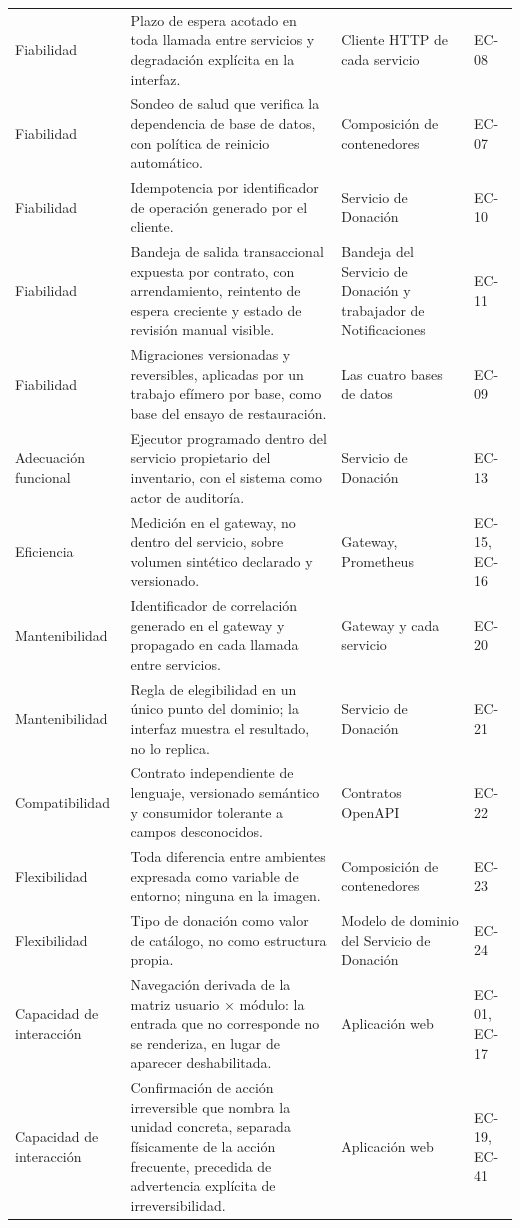 \documentclass[11pt,a4paper]{article}
\begin{document}
\begin{longtable}{L{2.4cm} L{5.6cm} L{3.4cm} L{2.4cm}}
Fiabilidad & Plazo de espera acotado en toda llamada entre servicios y degradación explícita en la interfaz. & Cliente HTTP de cada servicio & EC-08 \\
Fiabilidad & Sondeo de salud que verifica la dependencia de base de datos, con política de reinicio automático. & Composición de contenedores & EC-07 \\
Fiabilidad & Idempotencia por identificador de operación generado por el cliente. & Servicio de Donación & EC-10 \\
Fiabilidad & Bandeja de salida transaccional expuesta por contrato, con arrendamiento, reintento de espera creciente y estado de revisión manual visible. & Bandeja del Servicio de Donación y trabajador de Notificaciones & EC-11 \\
Fiabilidad & Migraciones versionadas y reversibles, aplicadas por un trabajo efímero por base, como base del ensayo de restauración. & Las cuatro bases de datos & EC-09 \\
Adecuación funcional & Ejecutor programado dentro del servicio propietario del inventario, con el sistema como actor de auditoría. & Servicio de Donación & EC-13 \\
Eficiencia & Medición en el gateway, no dentro del servicio, sobre volumen sintético declarado y versionado. & Gateway, Prometheus & EC-15, EC-16 \\
Mantenibilidad & Identificador de correlación generado en el gateway y propagado en cada llamada entre servicios. & Gateway y cada servicio & EC-20 \\
Mantenibilidad & Regla de elegibilidad en un único punto del dominio; la interfaz muestra el resultado, no lo replica. & Servicio de Donación & EC-21 \\
Compatibilidad & Contrato independiente de lenguaje, versionado semántico y consumidor tolerante a campos desconocidos. & Contratos OpenAPI & EC-22 \\
Flexibilidad & Toda diferencia entre ambientes expresada como variable de entorno; ninguna en la imagen. & Composición de contenedores & EC-23 \\
Flexibilidad & Tipo de donación como valor de catálogo, no como estructura propia. & Modelo de dominio del Servicio de Donación & EC-24 \\
Capacidad de interacción & Navegación derivada de la matriz usuario × módulo: la entrada que no corresponde no se renderiza, en lugar de aparecer deshabilitada. & Aplicación web & EC-01, EC-17 \\
Capacidad de interacción & Confirmación de acción irreversible que nombra la unidad concreta, separada físicamente de la acción frecuente, precedida de advertencia explícita de irreversibilidad. & Aplicación web & EC-19, EC-41 \\

\end{longtable}
\end{document}
